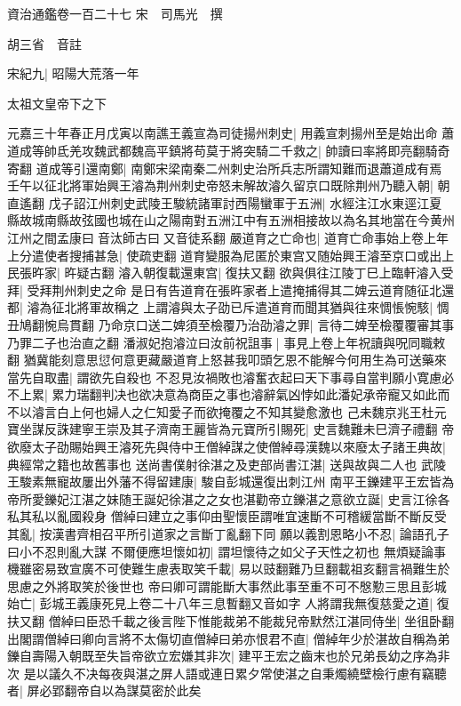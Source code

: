 資治通鑑卷一百二十七
宋　司馬光　撰

胡三省　音註

宋紀九|{
	昭陽大荒落一年}


太祖文皇帝下之下

元嘉三十年春正月戊寅以南譙王義宣為司徒揚州刺史|{
	用義宣刺揚州至是始出命}
蕭道成等帥氐羌攻魏武都魏高平鎮將苟莫于將突騎二千救之|{
	帥讀曰率將即亮翻騎奇寄翻}
道成等引還南鄭|{
	南鄭宋梁南秦二州刺史治所兵志所謂知難而退蕭道成有焉}
壬午以征北將軍始興王濬為荆州刺史帝怒未解故濬久留京口既除荆州乃聽入朝|{
	朝直遙翻}
戊子詔江州刺史武陵王駿統諸軍討西陽蠻軍于五洲|{
	水經注江水東逕江夏縣故城南縣故弦國也城在山之陽南對五洲江中有五洲相接故以為名其地當在今黄州江州之間孟康曰音汰師古曰又音徒系翻}
嚴道育之亡命也|{
	道育亡命事始上卷上年}
上分遣使者搜捕甚急|{
	使疏吏翻}
道育變服為尼匿於東宫又随始興王濬至京口或出上民張旿家|{
	旿疑古翻}
濬入朝復載還東宫|{
	復扶又翻}
欲與俱往江陵丁巳上臨軒濬入受拜|{
	受拜荆州刺史之命}
是日有告道育在張旿家者上遣掩捕得其二婢云道育随征北還都|{
	濬為征北將軍故稱之}
上謂濬與太子劭已斥遣道育而聞其猶與往來惆悵惋駭|{
	惆丑鳩翻惋烏貫翻}
乃命京口送二婢須至檢覆乃治劭濬之罪|{
	言待二婢至檢覆覆審其事乃罪二子也治直之翻}
潘淑妃抱濬泣曰汝前祝詛事|{
	事見上卷上年祝讀與呪同職敕翻}
猶冀能刻意思愆何意更藏嚴道育上怒甚我叩頭乞恩不能解今何用生為可送藥來當先自取盡|{
	謂欲先自殺也}
不忍見汝禍敗也濬奮衣起曰天下事尋自當判願小寛慮必不上累|{
	累力瑞翻判决也欲决意為商臣之事也濬辭氣凶悖如此潘妃承帝寵又如此而不以濬言白上何也婦人之仁知愛子而欲掩覆之不知其變愈激也}
己未魏京兆王杜元寶坐謀反誅建寧王崇及其子濟南王麗皆為元寶所引賜死|{
	史言魏難未巳濟子禮翻}
帝欲廢太子劭賜始興王濬死先與侍中王僧綽謀之使僧綽尋漢魏以來廢太子諸王典故|{
	典經常之籍也故舊事也}
送尚書僕射徐湛之及吏部尚書江湛|{
	送與故與二人也}
武陵王駿素無寵故屢出外藩不得留建康|{
	駿自彭城還復出刺江州}
南平王鑠建平王宏皆為帝所愛鑠妃江湛之妹随王誕妃徐湛之之女也湛勸帝立鑠湛之意欲立誕|{
	史言江徐各私其私以亂國殺身}
僧綽曰建立之事仰由聖懷臣謂唯宜速斷不可稽緩當斷不斷反受其亂|{
	按漢書齊相召平所引道家之言斷丁亂翻下同}
願以義割恩略小不忍|{
	論語孔子曰小不忍則亂大謀}
不爾便應坦懷如初|{
	謂坦懷待之如父子天性之初也}
無煩疑論事機雖密易致宣廣不可使難生慮表取笑千載|{
	易以豉翻難乃旦翻載祖亥翻言禍難生於思慮之外將取笑於後世也}
帝曰卿可謂能斷大事然此事至重不可不慇懃三思且彭城始亡|{
	彭城王義康死見上卷二十八年三息暫翻又音如字}
人將謂我無復慈愛之道|{
	復扶又翻}
僧綽曰臣恐千載之後言陛下惟能裁弟不能裁兒帝默然江湛同侍坐|{
	坐徂卧翻}
出閣謂僧綽曰卿向言將不太傷切直僧綽曰弟亦恨君不直|{
	僧綽年少於湛故自稱為弟}
鑠自壽陽入朝既至失旨帝欲立宏嫌其非次|{
	建平王宏之齒末也於兄弟長幼之序為非次}
是以議久不决每夜與湛之屏人語或連日累夕常使湛之自秉燭繞壁檢行慮有竊聽者|{
	屏必郢翻帝自以為謀莫密於此矣}
